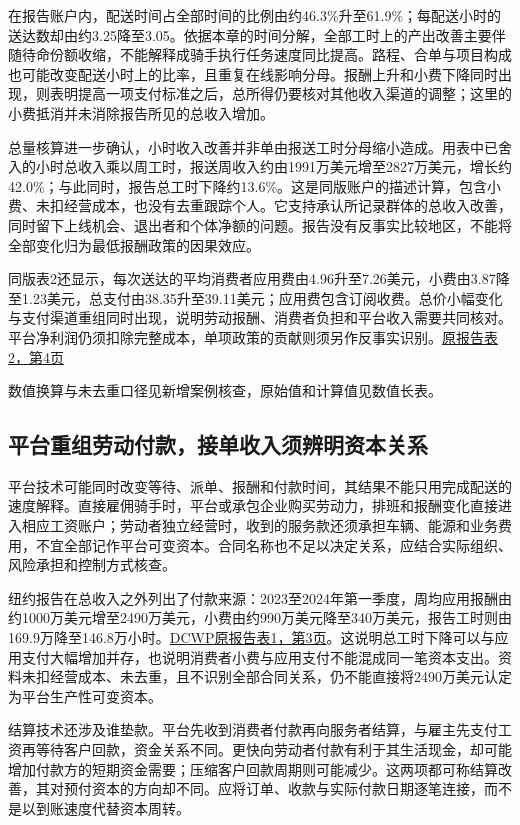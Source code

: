 \documentclass[UTF8,fontset=windows,12pt,a4paper,oneside,openany]{ctexbook}
\begin{document}
在报告账户内，配送时间占全部时间的比例由约46.3\%升至61.9\%；每配送小时的送达数却由约3.25降至3.05。依据本章的时间分解，全部工时上的产出改善主要伴随待命份额收缩，不能解释成骑手执行任务速度同比提高。路程、合单与项目构成也可能改变配送小时上的比率，且重复在线影响分母。报酬上升和小费下降同时出现，则表明提高一项支付标准之后，总所得仍要核对其他收入渠道的调整；这里的小费抵消并未消除报告所见的总收入增加。

总量核算进一步确认，小时收入改善并非单由报送工时分母缩小造成。用表中已舍入的小时总收入乘以周工时，报送周收入约由1991万美元增至2827万美元，增长约42.0\%；与此同时，报告总工时下降约13.6\%。这是同版账户的描述计算，包含小费、未扣经营成本，也没有去重跟踪个人。它支持承认所记录群体的总收入改善，同时留下上线机会、退出者和个体净额的问题。报告没有反事实比较地区，不能将全部变化归为最低报酬政策的因果效应。

同版表2还显示，每次送达的平均消费者应用费由4.96升至7.26美元，小费由3.87降至1.23美元，总支付由38.35升至39.11美元；应用费包含订阅收费。总价小幅变化与支付渠道重组同时出现，说明劳动报酬、消费者负担和平台收入需要共同核对。平台净利润仍须扣除完整成本，单项政策的贡献则须另作反事实识别。\href{https://www.nyc.gov/assets/dca/downloads/pdf/workers/Restaurant-Delivery-App-Data-Q1-2024.pdf}{原报告表2，第4页}

数值换算与未去重口径见新增案例核查，原始值和计算值见数值长表。

\subsection{平台重组劳动付款，接单收入须辨明资本关系}

平台技术可能同时改变等待、派单、报酬和付款时间，其结果不能只用完成配送的速度解释。直接雇佣骑手时，平台或承包企业购买劳动力，排班和报酬变化直接进入相应工资账户；劳动者独立经营时，收到的服务款还须承担车辆、能源和业务费用，不宜全部记作平台可变资本。合同名称也不足以决定关系，应结合实际组织、风险承担和控制方式核查。

纽约报告在总收入之外列出了付款来源：2023至2024年第一季度，周均应用报酬由约1000万美元增至2490万美元，小费由约990万美元降至340万美元，报告工时则由169.9万降至146.8万小时。\href{https://www.nyc.gov/assets/dca/downloads/pdf/workers/Restaurant-Delivery-App-Data-Q1-2024.pdf}{DCWP原报告表1，第3页}。这说明总工时下降可以与应用支付大幅增加并存，也说明消费者小费与应用支付不能混成同一笔资本支出。资料未扣经营成本、未去重，且不识别全部合同关系，仍不能直接将2490万美元认定为平台生产性可变资本。

结算技术还涉及谁垫款。平台先收到消费者付款再向服务者结算，与雇主先支付工资再等待客户回款，资金关系不同。更快向劳动者付款有利于其生活现金，却可能增加付款方的短期资金需要；压缩客户回款周期则可能减少。这两项都可称结算改善，其对预付资本的方向却不同。应将订单、收款与实际付款日期逐笔连接，而不是以到账速度代替资本周转。
\end{document}

